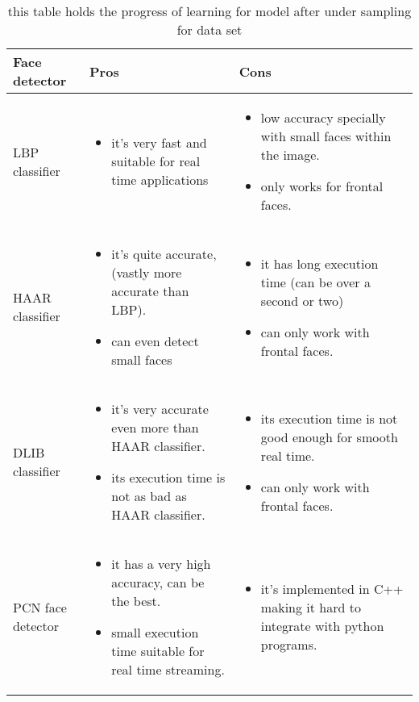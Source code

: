 \begin{table}[h!]
	\centering
	\begin{tabular}{m{3cm} | m{5cm} | m{5cm}}
		\textbf{Face detector} & \textbf{Pros} & \textbf{Cons}\\ \hline 
		LBP classifier 
		&
		\begin{itemize}
			\item it's very fast and suitable for real time applications 
		\end{itemize}

		& 
		\begin{itemize}
			\item low accuracy specially with small faces within the image.
			\item only works for frontal faces.
		\end{itemize}
		\\ \hline
		
		HAAR classifier 
		& 
		\begin{itemize}
			\item it's quite accurate, (vastly more accurate than LBP).
			\item can even detect small faces
		\end{itemize}
		& 
		\begin{itemize}
			\item it has long execution time (can be over a second or two)
			\item can only work with frontal faces.
		\end{itemize} 
		\\ \hline
		
		DLIB classifier 
		& 
		\begin{itemize}
			\item it's very accurate even more than HAAR classifier.
			\item its execution time is not as bad as HAAR classifier.
		\end{itemize}
		& 
		\begin{itemize}
			\item its execution time is not good enough for smooth real time.
			\item can only work with frontal faces.
		\end{itemize}
		\\ \hline
		
		PCN face detector 
		& 
		\begin{itemize}
			\item it has a very high accuracy, can be the best.
			\item small execution time suitable for real time streaming.
		\end{itemize} 
		& 
		\begin{itemize}
			\item it's implemented in C++ making it hard to integrate with python programs.
		\end{itemize}
		\\
	\end{tabular}
	\label{tab:facedetectors_compared}
	\caption{this table holds the progress of learning for model after under sampling for data set}
\end{table}
